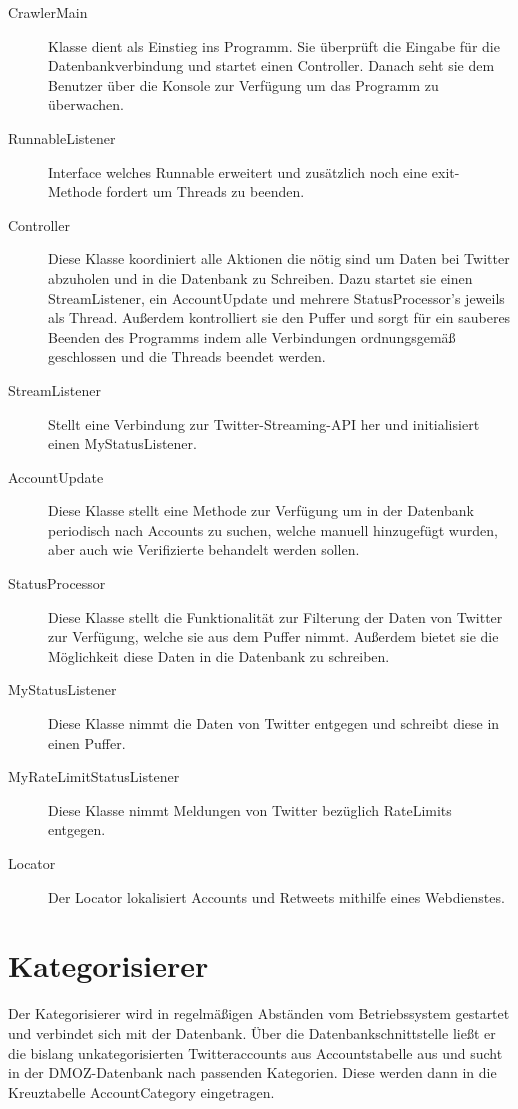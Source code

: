 \begin{description}
\item[CrawlerMain] Klasse dient als Einstieg ins Programm. Sie überprüft die Eingabe für die Datenbankverbindung und startet einen Controller. Danach seht sie dem Benutzer über die Konsole zur Verfügung um das Programm zu überwachen.
\item[RunnableListener] Interface welches Runnable erweitert und zusätzlich noch eine exit-Methode fordert um Threads zu beenden.
\item[Controller] Diese Klasse koordiniert alle Aktionen die nötig sind um Daten bei Twitter abzuholen und in die Datenbank zu Schreiben. Dazu startet sie einen StreamListener, ein AccountUpdate und mehrere StatusProcessor's jeweils als Thread. Außerdem kontrolliert sie den Puffer und sorgt für ein sauberes Beenden des Programms indem alle Verbindungen ordnungsgemäß geschlossen und die Threads beendet werden.
\item[StreamListener] Stellt eine Verbindung zur Twitter-Streaming-API her und initialisiert einen MyStatusListener.
\item[AccountUpdate] Diese Klasse stellt eine Methode zur Verfügung um in der Datenbank periodisch nach Accounts zu suchen, welche manuell hinzugefügt wurden, aber auch wie Verifizierte behandelt werden sollen.
\item[StatusProcessor] Diese Klasse stellt die Funktionalität zur Filterung der Daten von Twitter zur Verfügung, welche sie aus dem Puffer nimmt. Außerdem bietet sie die Möglichkeit diese Daten in die Datenbank zu schreiben.
\item[MyStatusListener] Diese Klasse nimmt die Daten von Twitter entgegen und schreibt diese in einen Puffer.
\item[MyRateLimitStatusListener] Diese Klasse nimmt Meldungen von Twitter bezüglich RateLimits entgegen.
\item[Locator] Der Locator lokalisiert Accounts und Retweets mithilfe eines Webdienstes.
\end{description}

\section{Kategorisierer}

Der Kategorisierer wird in regelmäßigen Abständen vom Betriebssystem gestartet und verbindet sich mit der Datenbank. Über die Datenbankschnittstelle ließt er die bislang unkategorisierten Twitteraccounts aus Accountstabelle aus und sucht in der DMOZ-Datenbank nach passenden Kategorien. Diese werden dann in die Kreuztabelle AccountCategory eingetragen.

